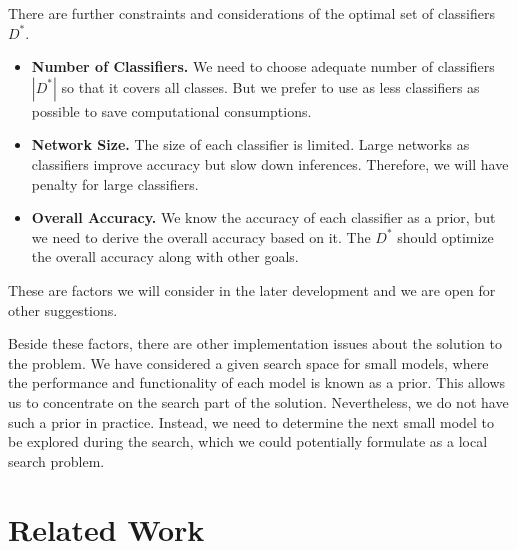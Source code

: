 \documentclass[acmsmall,nonacm]{acmart}\settopmatter{}
\begin{document}
There are further constraints and considerations of the optimal set of classifiers $D^*$.
\begin{itemize}
    \item \textbf{Number of Classifiers.} We need to choose adequate number of classifiers $|D^*|$ so that it covers all classes. But we prefer to use as less classifiers as possible to save computational consumptions.
    \item \textbf{Network Size.} The size of each classifier is limited. Large networks as classifiers improve accuracy but slow down inferences. Therefore, we will have penalty for large classifiers.
    \item \textbf{Overall Accuracy.} We know the accuracy of each classifier as a prior, but we need to derive the overall accuracy based on it. The $D^*$ should optimize the overall accuracy along with other goals.
\end{itemize}
These are factors we will consider in the later development and we are open for other suggestions.

Beside these factors, there are other implementation issues about the solution to the problem.
We have considered a given search space for small models, where the performance and functionality of each model is known as a prior.
This allows us to concentrate on the search part of the solution.
Nevertheless, we do not have such a prior in practice.
Instead, we need to determine the next small model to be explored during the search, which we could potentially formulate as a local search problem.

\section{Related Work}



% 
% 




\end{document}
